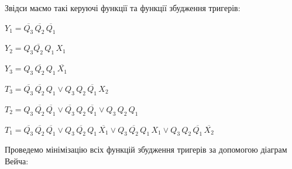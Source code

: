\documentclass[12pt,a4paper]{article}
\begin{document}
\begin{table}[h!]
{\begin{tabular}
                \hline

            \end{tabular}%
        }
        \caption{Структурна таблиця керуючого автомата}
    \end{table}

    \noindent
    Звідси маємо такі керуючі функції та функції збудження тригерів:

    \vspace{1em}

    $Y_1 = \overline{Q_3} \, \overline{Q_2} \, \overline{Q_1}$

    \vspace{1em}

    $Y_2 = Q_3 \overline{Q_2} \, Q_1 \, X_1$

    \vspace{1em}

    $Y_3 = Q_3 \, \overline{Q_2} \, Q_1 \, \overline{X_1}$

    \vspace{1em}

    $T_3 = \overline{Q_3} \, \overline{Q_2} \, Q_1 \vee Q_3 \, Q_2 \, \overline{Q_1} \, X_2$

    \vspace{1em}

    $T_2 = Q_3 \, \overline{Q_2} \, \overline{Q_1} \vee \overline{Q_3} \, Q_2 \, \overline{Q_1} \vee Q_3 \, Q_2 \, Q_1$

    \vspace{1em}

    $T_1 = \overline{Q_3} \, \overline{Q_2} \, \overline{Q_1} \vee Q_3 \, \overline{Q_2} \, Q_1 \, \overline{X_1} \vee Q_3 \, \overline{Q_2} \, Q_1 \, X_1 \vee Q_3 \, Q_2 \, \overline{Q_1} \, \overline{X_2}$

    \vspace{1em}

    \newpage

    \noindent
    Проведемо мінімізацію всіх функцій збудження тригерів за допомогою діаграм Вейча:

    \vspace{1em}
\end{document}
